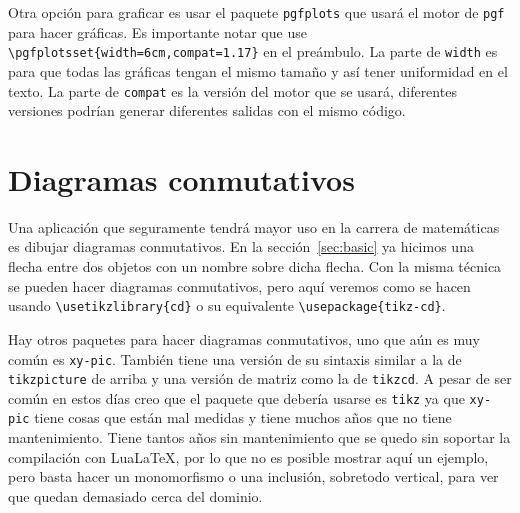 Otra opción para graficar es usar el paquete \texttt{pgfplots} que usará el motor de \texttt{pgf} para hacer gráficas. Es importante notar que use \verb|\pgfplotsset{width=6cm,compat=1.17}| en el preámbulo. La parte de \texttt{width} es para que todas las gráficas tengan el mismo tamaño y así tener uniformidad en el texto. La parte de \texttt{compat} es la versión del motor que se usará, diferentes versiones podrían generar diferentes salidas con el mismo código.
\begin{center}
\end{center}


\section{Diagramas conmutativos}
Una aplicación que seguramente tendrá mayor uso en la carrera de matemáticas
es dibujar diagramas conmutativos. En la sección~\ref{sec:basic} ya hicimos
una flecha entre dos objetos con un nombre sobre dicha flecha. Con la misma
técnica se pueden hacer diagramas conmutativos, pero aquí veremos como se
hacen usando \verb|\usetikzlibrary{cd}| o su equivalente
\verb|\usepackage{tikz-cd}|.
\begin{center}
\end{center}

Hay otros paquetes para hacer diagramas conmutativos, uno que aún es muy
común es \texttt{xy-pic}. También tiene una versión de su sintaxis similar
a la de \texttt{tikzpicture} de arriba y una versión de matriz como la de
\texttt{tikzcd}. A pesar de ser común en estos días creo que el paquete que
debería usarse es \texttt{tikz} ya que \texttt{xy-pic} tiene cosas que
están mal medidas y tiene muchos años que no tiene mantenimiento. Tiene
tantos años sin mantenimiento que se quedo sin soportar la compilación con
Lua\LaTeX, por lo que no es posible mostrar aquí un ejemplo, pero basta
hacer un monomorfismo o una inclusión, sobretodo vertical, para ver que
quedan demasiado cerca del dominio.

